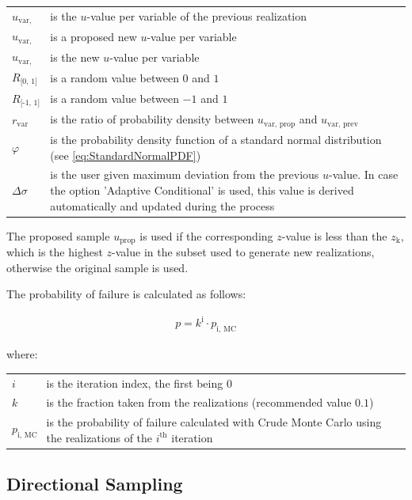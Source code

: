 {\begin{longtable}{p{16mm}p{\textwidth-24pt-16mm}}  
	$u_{\text{var, prev}}$ & is the $u$-value per variable of the previous realization \\
	$u_{\text{var, prop}}$ & is a proposed new $u$-value per variable \\
	$u_{\text{var, new}}$ & is the new $u$-value per variable \\
	$R_{\text{[0, 1]}}$ & is a random value between $0$ and $1$ \\  
	$R_{\text{[-1, 1]}}$ & is a random value between $-1$ and $1$ \\  
	$r_{\text{var}}$ & is the ratio of probability density between $u_{\text{var, prop}}$ and $u_{\text{var, prev}}$ \\  
	$\varphi$ & is the probability density function of a standard normal distribution (see \autoref{eq:StandardNormalPDF}) \\  
	$\Delta \sigma$ & is the user given maximum deviation from the previous $u$-value.
	In case the option 'Adaptive Conditional' is used,
	this value is derived automatically and updated during the process
\end{longtable}

The proposed sample $u_{\text{prop}}$ is used if the corresponding $z$-value is less than the $z_{\text{k}}$, which is the highest $z$-value in the subset used to generate new realizations, otherwise the original sample is used.

The probability of failure is calculated as follows:

\begin{align} 
\label{eq:SubsetSimulation}
p = k^{\text{i}} \cdot p_{\text{i, MC}}
\end{align}

where:

\begin{longtable}{p{16mm}p{\textwidth-24pt-16mm}}  
	$i$ & is the iteration index, the first being $0$ \\
	$k$ & is the fraction taken from the realizations (recommended value $0.1$) \\  
	$p_{\text{i, MC}}$ & is the probability of failure calculated with Crude Monte Carlo using the realizations of the $i^{\text{th}}$ iteration
\end{longtable}

\newpage
\subsection{Directional Sampling}
\label{sec:DirectionalSampling}

}
